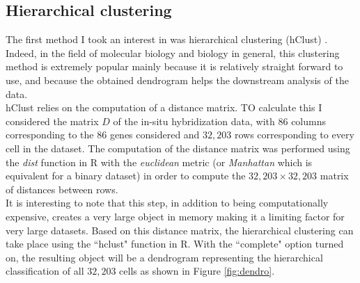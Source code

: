 	\subsection{Hierarchical clustering}
	The first method I took an interest in was hierarchical clustering (hClust) \cite{johnson67}. Indeed, in the field of molecular biology and biology in general, this clustering method is extremely popular mainly because it is relatively straight forward to use, and because the obtained dendrogram helps the downstream analysis of the data.\\
	
	hClust relies on the computation of a distance matrix. TO calculate this I considered the matrix $D$ of the in-situ hybridization data, with $86$ columns corresponding to the 86 genes considered and $32,203$ rows corresponding to every cell in the dataset. The computation of the distance matrix was performed using the \emph{dist} function in R with the \emph{euclidean} metric (or \emph{Manhattan} which is equivalent for a binary dataset) in order to compute the $32,203 \times 32,203$ matrix of distances between rows.\\
	
	It is interesting to note that this step, in addition to being computationally expensive, creates a very large object in memory making it a limiting factor for very large datasets. Based on this distance matrix, the hierarchical clustering can take place using the ``hclust" function in R. With the ``complete" option turned on, the resulting object will be a dendrogram  representing the hierarchical classification of all $32,203$ cells as shown in Figure \ref{fig:dendro}.\\
	
